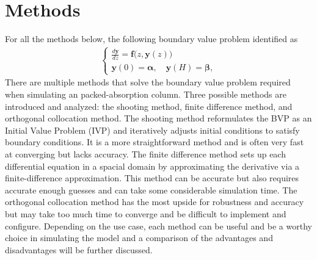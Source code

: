 \documentclass[a4paper,fleqn]{cas-sc}
\begin{document}
    \section{Methods}
    For all the methods below, the following boundary value problem identified as
    \begin{align}
        \begin{cases}
            \displaystyle
            \frac{d \mathbf{y}}{dz} = \mathbf{f}\bigl(z, \mathbf{y}(z)\bigr) \\
            \mathbf{y}(0) = \boldsymbol{\alpha}, \quad \mathbf{y}(H) = \boldsymbol{\beta},
        \end{cases}
    \end{align}
    There are multiple methods that solve the boundary value problem required when simulating an packed-absorption column. Three possible methods are introduced and analyzed: the shooting method, finite difference method, and orthogonal collocation method. The shooting method reformulates the BVP as an Initial Value Problem (IVP) and iteratively adjusts initial conditions to satisfy boundary conditions. It is a more straightforward method and is often very fast at converging but lacks accuracy. The finite difference method sets up each differential equation in a spacial domain by approximating the derivative via a finite-difference approximation. This method can be accurate but also requires accurate enough guesses and can take some considerable simulation time. The orthogonal collocation method has the most upside for robustness and accuracy but may take too much time to converge and be difficult to implement and configure. Depending on the use case, each method can be useful and be a worthy choice in simulating the model and a comparison of the advantages and disadvantages will be further discussed.
\end{document}
